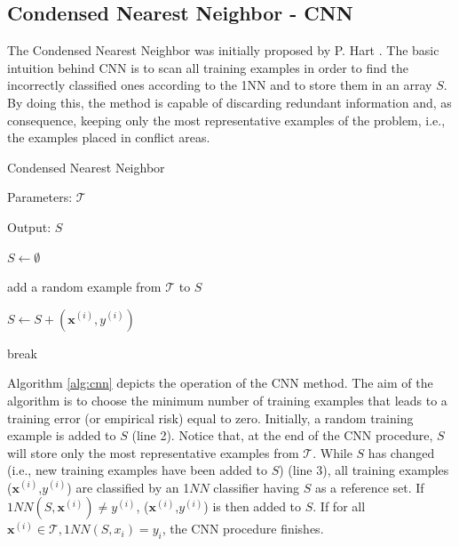 \subsection{Condensed Nearest Neighbor - CNN}

The Condensed Nearest Neighbor was initially proposed by P. Hart \cite{cnn:68}. The basic intuition behind CNN is to scan all training examples in order to find the incorrectly classified ones according to the 1NN and to store them in an array $S$. By doing this, the method is capable of discarding redundant information and, as consequence, keeping only the most representative examples of the problem, i.e., the examples placed in conflict areas. 


\vspace{0.2cm}

\begin{algorithm}[H]
    \label{alg:cnn}
    \caption{Condensed Nearest Neighbor}
    
    Parameters: $\mathcal{T}$
    
    Output: $S$
    
    \begin{algorithmic}[1] 
    
    \STATE $S \gets \emptyset$
   
    \STATE add a random example from $\mathcal{T}$ to $S$
   
        
    
                
                \STATE $S \gets S + (\mathbf{x}^{(i)}, y^{(i)})$
                
                \STATE break
                    
            \ENDIF
        \ENDFOR
        
    \ENDWHILE
  
  \end{algorithmic}
  
\end{algorithm}

\vspace{0.2cm}

Algorithm \ref{alg:cnn} depicts the operation of the CNN method. The aim of the algorithm is to choose the minimum number of training examples that leads to a training error (or empirical risk) equal to zero. Initially, a random training example is added to $S$ (line 2). Notice that, at the end of the CNN procedure, $S$ will store only the most representative examples from $\mathcal{T}$. While $S$ has changed (i.e., new training examples have been added to $S$) (line 3), all training examples ($\mathbf{x}^{(i)}$,$y^{(i)}$) are classified by an 1$NN$ classifier having $S$ as a reference set. If $1NN(S, \mathbf{x}^{(i)}) \neq y^{(i)}$, ($\mathbf{x}^{(i)}$,$y^{(i)}$) is then added to $S$. If for all $\mathbf{x}^{(i)} \in \mathcal{T}, 1NN(S, x_i) = y_i$, the CNN procedure finishes. 

